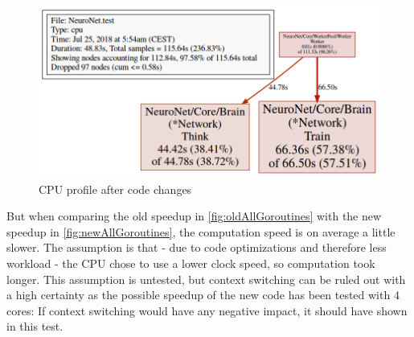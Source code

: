 \documentclass[11pt]{article}
\begin{document}
\begin{figure}[H]
	\centering
	\includegraphics[width=1.0\textwidth]{./Data/WrongMath/Images/pprofNew.png}
	\vspace{-1em}
	\caption{CPU profile after code changes}
	\vspace{-0.5em}
	\label{fig:pprofNew}
\end{figure}

But when comparing the old speedup in \autoref{fig:oldAllGoroutines} with the new speedup in \autoref{fig:newAllGoroutines}, the computation speed is on average a little slower. The assumption is that - due to code optimizations and therefore less workload - the CPU chose to use a lower clock speed, so computation took longer. This assumption is untested, but context switching can be ruled out with a high certainty as the possible speedup of the new code has been tested with 4 cores: If context switching would have any negative impact, it should have shown in this test.
\end{document}
